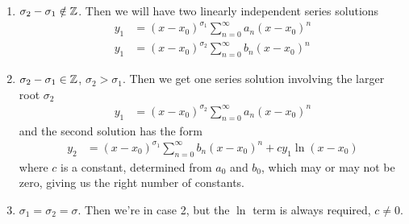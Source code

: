 \documentclass{../template/note}
\begin{document}
    \begin{enumerate}[label=\protect\circled{\arabic*}]
        \item \(\sigma_2 - \sigma_1 \notin \mathbb Z\). Then we will have two linearly independent series solutions
        \begin{align*}
            y_1 &= (x-x_0)^{\sigma_1}\sum_{n=0}^\infty a_n(x-x_0)^n \\
            y_1 &= (x-x_0)^{\sigma_2}\sum_{n=0}^\infty b_n(x-x_0)^n
        \end{align*}
        \item \(\sigma_2 - \sigma_1 \in \mathbb Z\), \(\sigma_2 > \sigma_1\). Then we get one series solution involving the larger root \(\sigma_2\)
        \begin{align*}
            y_1 &= (x-x_0)^{\sigma_2}\sum_{n=0}^\infty a_n(x-x_0)^n
        \end{align*}
        and the second solution has the form
        \begin{align*}
            y_2 &= (x-x_0)^{\sigma_1}\sum_{n=0}^\infty b_n(x-x_0)^n + cy_1\ln(x-x_0)
        \end{align*}
        where \(c\) is a constant, determined from \(a_0\) and \(b_0\), which may or may not be zero, giving us the right number of constants.
        \item \(\sigma_1=\sigma_2=\sigma\). Then we're in case 2, but the \(\ln\) term is always required, \(c \neq 0\).
    \end{enumerate}
    
\end{document}
